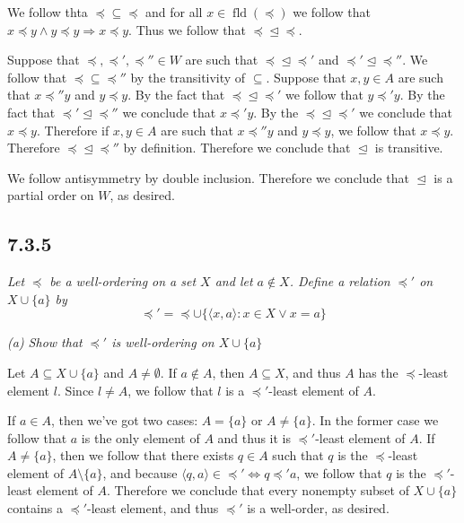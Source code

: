 \documentclass[11pt,oneside,titlepage]{book}
\DeclareMathOperator \fld {fld}
\DeclareMathOperator \lra {\Leftrightarrow}
\DeclareMathOperator \ra {\Rightarrow}
\newcommand{\eangle}[1]{\langle #1 \rangle}
\newcommand{\set}[1]{\{ #1 \}}
\begin{document}
We follow thta $\preceq \subseteq \preceq$ and for all $x \in \fld(\preceq)$ we follow that
$x \preceq y \land y \preceq y \ra x \preceq y$. Thus we follow that
$\preceq \trianglelefteq \preceq$.

Suppose that $\preceq, \preceq', \preceq'' \in W$ are such that
$\preceq \trianglelefteq \preceq'$ and $\preceq' \trianglelefteq \preceq''$.
We follow that $\preceq \subseteq \preceq''$ by the transitivity of $\subseteq$.
Suppose that $x, y \in A$ are such that $x \preceq'' y$ and $y \preceq y$.
By the fact that $\preceq \trianglelefteq \preceq'$ we follow that $y \preceq' y$.
By the fact that $\preceq' \trianglelefteq \preceq''$ we conclude that
$x \preceq' y$. By the $\preceq \trianglelefteq \preceq'$ we conclude that
$x \preceq y$. Therefore if $x, y \in A$ are such that
$x \preceq'' y$ and $y \preceq y$, we follow that $x \preceq y$. Therefore
$\preceq \trianglelefteq \preceq''$ by definition. Therefore we conclude that
$\trianglelefteq$ is transitive.

We follow antisymmetry by double inclusion. Therefore we conclude that
$\trianglelefteq$ is a partial order on $W$, as desired.

\subsection*{7.3.5}

\textit{Let $\preceq$ be a well-ordering on a set $X$ and let $a \notin X$. Define
  a relation $\preceq'$ on $X \cup \set{a}$ by
  $$\preceq' =  \preceq \cup \set{\eangle{x, a}: x \in X \lor x = a}$$
}

\textit{(a) Show that $\preceq'$ is well-ordering on $X \cup \set{a}$}

Let $A \subseteq X \cup \set{a}$ and $A \neq \emptyset$.
If $a \notin A$, then $A \subseteq X$, and thus
$A$ has the $\preceq$-least element $l$. Since $l \neq A$, we follow that $l$ is
a $\preceq'$-least element of $A$.

If $a \in A$, then we've got two cases: $A = \set{a}$ or $A \neq \set{a}$. In the former
case we follow that $a$ is the only element of $A$ and thus it is $\preceq'$-least
element of $A$. If $A \neq \set{a}$, then we follow that there exists $q \in A$ such that
$q$ is the $\preceq$-least element of $A \setminus \set{a}$, and because
$\eangle{q, a} \in \preceq' \lra q \preceq' a$, we follow that $q$ is the $\preceq'$-least
element of $A$. Therefore we conclude that every nonempty subset of $X \cup \set{a}$ contains
a $\preceq'$-least element, and thus $\preceq'$ is a well-order, as desired.
\end{document}
